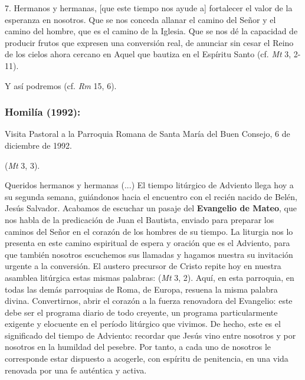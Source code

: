 \begin{body}
\begin{body}
		7. Hermanos y hermanas, {[}que este tiempo nos ayude a{]} fortalecer el valor de la esperanza en nosotros. Que se nos conceda allanar el camino del Señor y el camino del hombre, que es el camino de la Iglesia. Que se nos dé la capacidad de producir frutos que expresen una conversión real, de anunciar sin cesar el Reino de los cielos ahora cercano en Aquel que bautiza en el Espíritu Santo (cf. \emph{Mt} 3, 2-11).
		
		Y así podremos  (cf. \emph{Rm} 15, 6).
	\end{body}
	
	\subsubsection{Homilía (1992): }
	
	Visita Pastoral a la Parroquia Romana de Santa María del Buen Consejo, 6 de diciembre de 1992.
	
	\begin{body}
		 (\emph{Mt} 3, 3).
		
		Queridos hermanos y hermanas (...) El tiempo litúrgico de Adviento llega hoy a su segunda semana, guiándonos hacia el encuentro con el recién nacido de Belén, Jesús Salvador. Acabamos de escuchar un pasaje del \textbf{Evangelio de Mateo}, que nos habla de la predicación de Juan el Bautista, enviado para preparar los caminos del Señor en el corazón de los hombres de su tiempo. La liturgia nos lo presenta en este camino espiritual de espera y oración que es el Adviento, para que también nosotros escuchemos sus llamadas y hagamos nuestra su invitación urgente a la conversión. El austero precursor de Cristo repite hoy en nuestra asamblea litúrgica estas mismas palabras:  (\emph{Mt} 3, 2). Aquí, en esta parroquia, en todas las demás parroquias de Roma, de Europa, resuena la misma palabra divina. Convertirnos, abrir el corazón a la fuerza renovadora del Evangelio: este debe ser el programa diario de todo creyente, un programa particularmente exigente y elocuente en el período litúrgico que vivimos. De hecho, este es el significado del tiempo de Adviento: recordar que Jesús vino entre nosotros y por nosotros en la humildad del pesebre. Por tanto, a cada uno de nosotros le corresponde estar dispuesto a acogerle, con espíritu de penitencia, en una vida renovada por una fe auténtica y activa.
		

\end{body}
\end{body}
